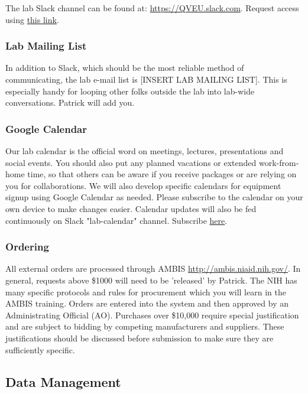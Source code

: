 \documentclass[10pt, letterpaper, twocolumn]{article} %
\begin{document}
The lab Slack channel can be found at: \href{https://QVEU.slack.com}{https://QVEU.slack.com}. Request access using \href{https://join.slack.com/t/qveu/shared_invite/zt-sspu46d0-mJUV8OjwjOoJTaFyPKGlZg}{this link}.\newline

\subsubsection{Lab Mailing List}
In addition to Slack, which should be the most reliable method of communicating, the lab e-mail list is [INSERT LAB MAILING LIST]. This is especially handy for looping other folks outside the lab into lab-wide conversations. Patrick will add you.

\subsubsection{Google Calendar}
Our lab calendar is the official word on meetings, lectures, presentations and social events. You should also put any planned vacations or extended work-from-home time, so that others can be aware if you receive packages or are relying on you for collaborations. We will also develop specific calendars for equipment signup using Google Calendar as needed. Please subscribe to the calendar on your own device to make changes easier. Calendar updates will also be fed continuously on Slack "lab-calendar" channel. Subscribe \href{https://calendar.google.com/calendar/u/0?cid=dGhlcXZldUBnbWFpbC5jb20z}{here}.

\subsubsection{Ordering}
 All external orders are processed through AMBIS \href{http://ambis.niaid.nih.gov/}{http://ambis.niaid.nih.gov/}. In general, requests above \$1000 will need to be 'released' by Patrick. The NIH has many specific protocols and rules for procurement which you will learn in the AMBIS training. Orders are entered into the system and then approved by an Administrating Official (AO). Purchases over \$10,000 require special justification and are subject to bidding by competing manufacturers and suppliers. These justifications should be discussed before submission to make sure they are sufficiently specific.

\subsection{Data Management}
\end{document}
